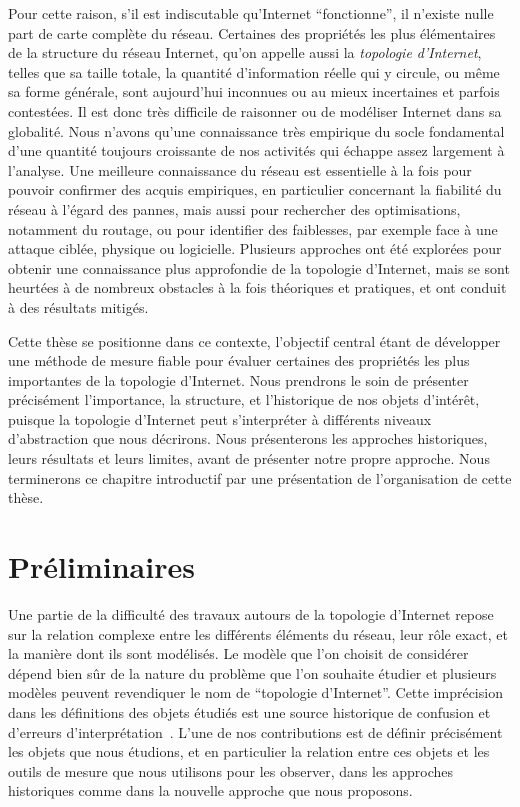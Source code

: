 Pour cette raison, s'il est indiscutable qu'Internet ``fonctionne'', il n'existe
nulle part de carte complète du réseau. Certaines des propriétés les plus
élémentaires de la structure du réseau Internet, qu'on appelle aussi la {\em
topologie d'Internet}, telles que sa taille totale, la quantité d'information
réelle qui y circule, ou même sa forme générale, sont aujourd'hui inconnues ou
au mieux incertaines et parfois contestées. Il est donc très difficile de
raisonner ou de modéliser Internet dans sa globalité. Nous n'avons qu'une
connaissance très empirique du socle fondamental d'une quantité toujours
croissante de nos activités qui échappe assez largement à l'analyse.
Une meilleure connaissance du réseau est essentielle à la fois pour pouvoir
confirmer des acquis empiriques, en particulier concernant la fiabilité du
réseau à l'égard des pannes, mais aussi pour rechercher des optimisations,
notamment du routage, ou pour identifier des faiblesses, par exemple face à une
attaque ciblée, physique ou logicielle. Plusieurs approches ont été explorées
pour obtenir une connaissance plus approfondie de la topologie d'Internet, mais
se sont heurtées à de nombreux obstacles à la fois théoriques et pratiques, et
ont conduit à des résultats mitigés.

Cette thèse se positionne dans ce contexte, l'objectif central étant de
développer une méthode de mesure fiable pour évaluer certaines des propriétés
les plus importantes de la topologie d'Internet.
Nous prendrons le soin de présenter précisément l'importance, la structure, et
l'historique de nos objets d'intérêt, puisque la topologie d'Internet peut
s'interpréter à différents niveaux d'abstraction que nous décrirons. Nous
présenterons les approches historiques, leurs résultats et leurs limites, avant
de présenter notre propre approche. Nous terminerons ce chapitre introductif par
une présentation de l'organisation de cette thèse.

\newpage

\section{Préliminaires}

Une partie de la difficulté des travaux autours de la topologie d'Internet
repose sur la relation complexe entre les différents éléments du réseau, leur
rôle exact, et la manière dont ils sont modélisés. Le modèle que l'on choisit de
considérer dépend bien sûr de la nature du problème que l'on souhaite étudier et
plusieurs modèles peuvent revendiquer le nom de ``topologie d'Internet''. Cette
imprécision dans les définitions des objets étudiés est une source historique de
confusion et d'erreurs d'interprétation~\cite{willinger}. L'une de nos
contributions est de définir précisément les objets que nous étudions, et en
particulier la relation entre ces objets et les outils de mesure que nous
utilisons pour les observer, dans les approches historiques comme dans la
nouvelle approche que nous proposons.

